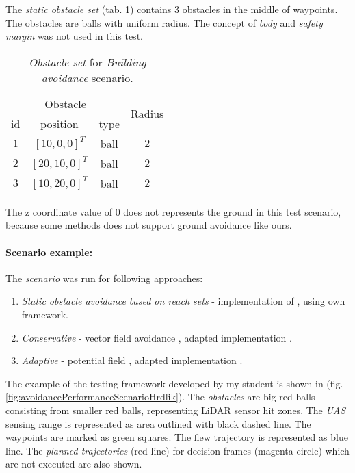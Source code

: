 \noindent The \emph{static obstacle set} (tab. \ref{tab:obstacleSetComparison}) contains 3 obstacles in the middle of waypoints. The obstacles are balls with uniform radius. The concept of \emph{body} and \emph{safety margin} was not used in this test.

\begin{table}[H]
	\centering
	\begin{tabular}{c|c|c|c}
		\multicolumn{3}{c|}{Obstacle} &  \multirow{2}{*}{Radius}\\\cline{1-3}
		id & position & type  &   \\\hline\hline
		$1$ & $[10,0,0]^T$ & ball  &$2$ \\\hline
		$2$ & $[20,10,0]^T$ & ball & $2$ \\\hline 
		$3$ & $[10,20,0]^T$ & ball  & $2$ 
	 \end{tabular}
	\caption{\emph{Obstacle set} for \emph{Building avoidance} scenario.}
	\label{tab:obstacleSetComparison}
\end{table}

\begin{note}
The z coordinate value of 0 does not represents the ground in this test scenario, because some methods does not support ground avoidance like ours. 
\end{note}

\paragraph{Scenario example:} The \emph{scenario} was run for following approaches:
\begin{enumerate}
    \item \emph{Static obstacle avoidance based on reach sets} - implementation \cite{hrdlik2018} of \cite{gomola2017obstacle}, using own framework.
    
    \item \emph{Conservative } - vector field avoidance \cite{borenstein1991vector}, adapted implementation \cite{hrdlik2018}.
    
    \item \emph{Adaptive} - potential field \cite{koren1991potential}, adapted implementation \cite{hrdlik2018}.
\end{enumerate}

\noindent The example of the testing framework developed by my student is shown in (fig. \ref{fig:avoidancePerformanceScenarioHrdlik}). The \emph{obstacles} are big red balls consisting from smaller red balls, representing LiDAR sensor hit zones. The \emph{UAS} sensing range is represented as area outlined with black dashed line. The waypoints are marked as green squares. The flew trajectory is represented as blue line. The \emph{planned trajectories} (red line) for decision frames (magenta circle) which are not executed are also shown.

